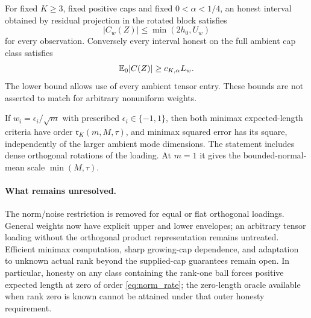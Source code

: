 \begin{theorem}\label{thm:weighted_bounds}
For fixed $K\ge3$, fixed positive caps and fixed $0<\alpha<1/4$, an honest interval obtained by residual projection in the rotated block satisfies
\[
 |C_w(Z)|\le\min(2h_0,U_w)
\]
for every observation. Conversely every interval honest on the full ambient cap class satisfies
\[
 \mathbb E_0|C(Z)|\ge c_{K,\alpha}L_w.
\]
The lower bound allows use of every ambient tensor entry. These bounds are not asserted to match for arbitrary nonuniform weights.
\end{theorem}

\begin{proposition}\label{prop:flat_loading}
If $w_i=\epsilon_i/\sqrt m$ with prescribed $\epsilon_i\in\{-1,1\}$, then both minimax expected-length criteria have order $\mathfrak r_K(m,M,\tau)$, and minimax squared error has its square, independently of the larger ambient mode dimensions. The statement includes dense orthogonal rotations of the loading. At $m=1$ it gives the bounded-normal-mean scale $\min(M,\tau)$.
\end{proposition}

\paragraph{What remains unresolved.}
The norm/noise restriction is removed for equal or flat orthogonal loadings. General weights now have explicit upper and lower envelopes; an arbitrary tensor loading without the orthogonal product representation remains untreated. Efficient minimax computation, sharp growing-cap dependence, and adaptation to unknown actual rank beyond the supplied-cap guarantees remain open. In particular, honesty on any class containing the rank-one ball forces positive expected length at zero of order \eqref{eq:norm_rate}; the zero-length oracle available when rank zero is known cannot be attained under that outer honesty requirement.
